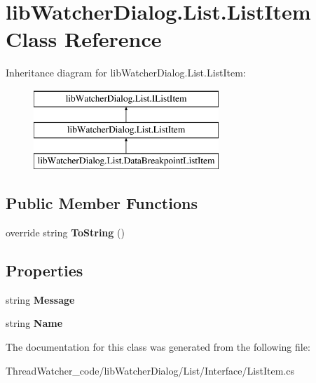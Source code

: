 \hypertarget{classlib_watcher_dialog_1_1_list_1_1_list_item}{\section{lib\+Watcher\+Dialog.\+List.\+List\+Item Class Reference}
\label{classlib_watcher_dialog_1_1_list_1_1_list_item}
}
Inheritance diagram for lib\+Watcher\+Dialog.\+List.\+List\+Item\+:\begin{figure}[H]
\begin{center}
\leavevmode
\includegraphics[height=3.000000cm]{classlib_watcher_dialog_1_1_list_1_1_list_item}
\end{center}
\end{figure}
\subsection*{Public Member Functions}
\begin{DoxyCompactItemize}
\item 
\hypertarget{classlib_watcher_dialog_1_1_list_1_1_list_item_abb25f09e05e486dd849526902f379e5f}{override string {\bfseries To\+String} ()}\label{classlib_watcher_dialog_1_1_list_1_1_list_item_abb25f09e05e486dd849526902f379e5f}

\end{DoxyCompactItemize}
\subsection*{Properties}
\begin{DoxyCompactItemize}
\item 
\hypertarget{classlib_watcher_dialog_1_1_list_1_1_list_item_ac109e26a4f52d9925e5440ef28a94bfd}{string {\bfseries Message}}\label{classlib_watcher_dialog_1_1_list_1_1_list_item_ac109e26a4f52d9925e5440ef28a94bfd}

\item 
\hypertarget{classlib_watcher_dialog_1_1_list_1_1_list_item_a446c9afe705191de2c16208a221afca8}{string {\bfseries Name}}\label{classlib_watcher_dialog_1_1_list_1_1_list_item_a446c9afe705191de2c16208a221afca8}

\end{DoxyCompactItemize}


The documentation for this class was generated from the following file\+:\begin{DoxyCompactItemize}
\item 
Thread\+Watcher\+\_\+code/lib\+Watcher\+Dialog/\+List/\+Interface/List\+Item.\+cs\end{DoxyCompactItemize}
